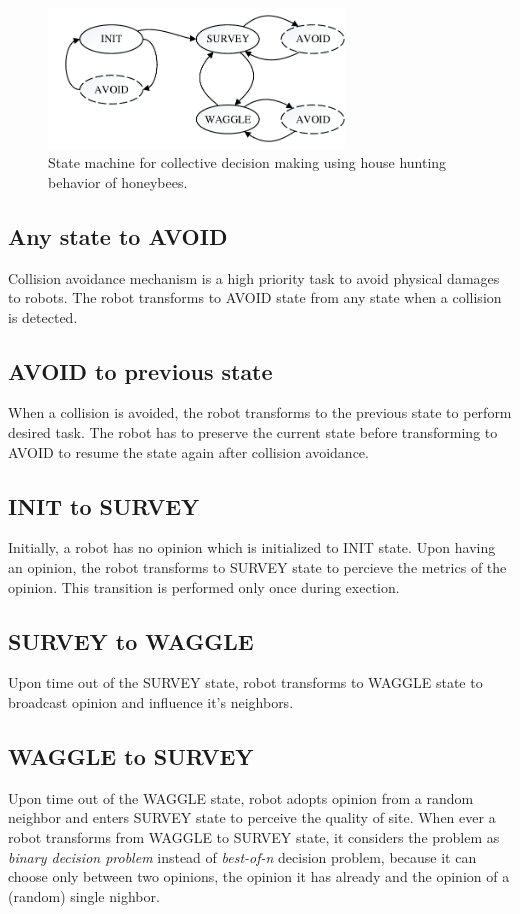 \documentclass{llncs}
\begin{document}
	\begin{figure}[h!]
		\centering
		\includegraphics[width=0.7\textwidth]{IMG/StateMachine}
		\caption{State machine for collective decision making using house hunting behavior of honeybees.}
		\label{fig:stateMachine}
	\end{figure}
	
	\subsection{Any state to AVOID}
	Collision avoidance mechanism is a high priority task to avoid physical damages to robots. The robot transforms to AVOID state from any state when a collision is detected.
	
	\subsection{AVOID to previous state}
	When a collision is avoided, the robot transforms to the previous state to perform desired task. The robot has to preserve the current state before transforming to AVOID to resume the state again after collision avoidance.
	
	\subsection{INIT to SURVEY}
	Initially, a robot has no opinion which is initialized to INIT state. Upon having an opinion, the robot transforms to SURVEY state to percieve the metrics of the opinion. This transition is performed only once during exection.
	
	\subsection{SURVEY to WAGGLE}
	Upon time out of the SURVEY state, robot transforms to WAGGLE state to broadcast opinion and influence it's neighbors.
	
	\subsection{WAGGLE to SURVEY}
	Upon time out of the WAGGLE state, robot adopts opinion from a random neighbor and enters SURVEY state to perceive the quality of site. When ever a robot transforms from WAGGLE to SURVEY state, it considers the problem as \textit{binary decision problem} instead of \textit{best-of-n} decision problem, because it can choose only between two opinions, the opinion it has already and the opinion of a (random) single nighbor.
	
\end{document}
